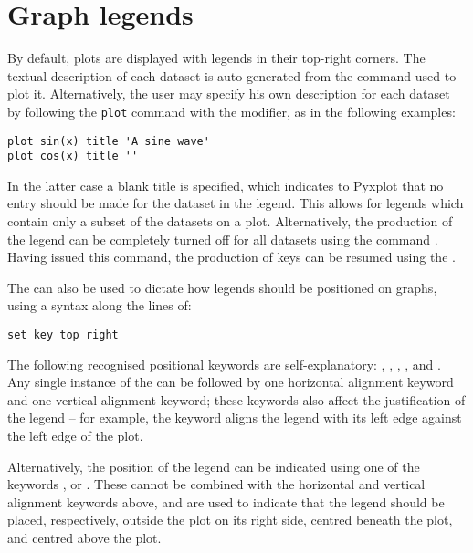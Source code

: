 \section{Graph legends}
\label{sec:legends}

By default, plots are displayed with legends in their top-right corners. The
textual description of each dataset is auto-generated from the command used
to plot it. Alternatively, the user may specify his own description for each
dataset by following the {\tt plot} command with the  modifier,
as in the following examples:

\begin{verbatim}
plot sin(x) title 'A sine wave'
plot cos(x) title ''
\end{verbatim}

In the latter case a blank title is specified, which indicates to Pyxplot that
no entry should be made for the dataset in the legend. This allows for legends
which contain only a subset of the datasets on a plot. Alternatively, the
production of the legend can be completely turned off for all datasets using
the command . Having issued this command, the production of
keys can be resumed using the .

The  can also be used to dictate how legends should be
positioned on graphs, using a syntax along the lines of:

\begin{verbatim}
set key top right
\end{verbatim}

The following recognised positional keywords are self-explanatory:
, , , ,
 and . Any single instance of the
 can be followed by one horizontal alignment keyword and one
vertical alignment keyword; these keywords also affect the justification of the
legend -- for example, the keyword  aligns the legend with its
left edge against the left edge of the plot.

Alternatively, the position of the legend can be indicated using one of the
keywords ,  or . These cannot be
combined with the horizontal and vertical alignment keywords above, and are
used to indicate that the legend should be placed, respectively, outside the
plot on its right side, centred beneath the plot, and centred above the plot.

